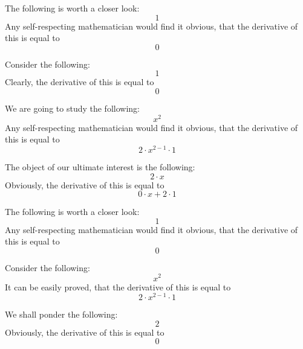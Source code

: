 \documentclass{article}
\begin{document}
The following is worth a closer look:
\begin{equation}
1 
\end{equation}
Any self-respecting mathematician would find it obvious, that the derivative of this is equal to
\begin{equation}
0 
\end{equation}

Consider the following:
\begin{equation}
1 
\end{equation}
Clearly, the derivative of this is equal to
\begin{equation}
0 
\end{equation}

We are going to study the following:
\begin{equation}
x ^{2 } 
\end{equation}
Any self-respecting mathematician would find it obvious, that the derivative of this is equal to
\begin{equation}
2 \cdot x ^{2 - 1 } \cdot 1 
\end{equation}

The object of our ultimate interest is the following:
\begin{equation}
2 \cdot x 
\end{equation}
Obviously, the derivative of this is equal to
\begin{equation}
0 \cdot x + 2 \cdot 1 
\end{equation}

The following is worth a closer look:
\begin{equation}
1 
\end{equation}
Any self-respecting mathematician would find it obvious, that the derivative of this is equal to
\begin{equation}
0 
\end{equation}

Consider the following:
\begin{equation}
x ^{2 } 
\end{equation}
It can be easily proved, that the derivative of this is equal to
\begin{equation}
2 \cdot x ^{2 - 1 } \cdot 1 
\end{equation}

We shall ponder the following:
\begin{equation}
2 
\end{equation}
Obviously, the derivative of this is equal to
\begin{equation}
0 
\end{equation}
\end{document}
